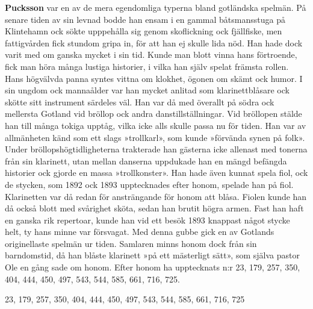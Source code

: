 \textbf{Pucksson} var en av de mera egendomliga typerna bland gotländska spelmän.
På senare tiden av sin levnad bodde han ensam i en gammal båtsmansstuga på Klintehamn ock sökte upppehålla sig genom skoflickning ock fjällfiske, men fattigvården fick stundom gripa in, för att han ej skulle lida nöd. Han hade dock varit med om ganska mycket i sin tid. Kunde man blott vinna hans förtroende, fick man höra många lustiga historier, i vilka han själv spelat främsta rollen. Hans högvälvda panna syntes vittna om klokhet, ögonen om skämt ock humor. I sin ungdom ock mannaålder var han mycket anlitad som klarinettblåsare ock skötte sitt instrument särdeles väl. Han var då med överallt på södra ock mellersta Gotland vid bröllop ock andra danstillställningar. Vid bröllopen stälde han till många tokiga upptåg, vilka icke alls skulle passa nu för tiden. Han var av allmänheten känd som ett slags »trollkarl», som kunde »förvända synen på folk». Under bröllopshögtidligheterna trakterade han gästerna icke allenast med tonerna från sin klarinett, utan mellan danserna uppdukade han en mängd befängda historier ock gjorde en massa »trollkonster». Han hade även kunnat spela fiol, ock de stycken, som 1892 ock 1893 upptecknades efter honom, spelade han på fiol. Klarinetten var då redan för ansträngande för honom att blåsa. Fiolen kunde han då också blott med svårighet sköta, sedan han brutit högra armen. Fast han haft en ganska rik repertoar, kunde han vid ett besök 1893 knappast något stycke helt, ty hans minne var försvagat. Med denna gubbe gick en av Gotlands originellaste spelmän ur tiden. Samlaren minns honom dock från sin barndomstid, då han blåste klarinett »på ett mästerligt sätt», som själva pastor Ole en gång sade om honom. Efter honom ha upptecknats n:r 23, 179, 257, 350, 404, 444, 450, 497, 543, 544, 585, 661, 716, 725.

23, 179, 257, 350, 404, 444, 450, 497, 543, 544, 585, 661, 716, 725